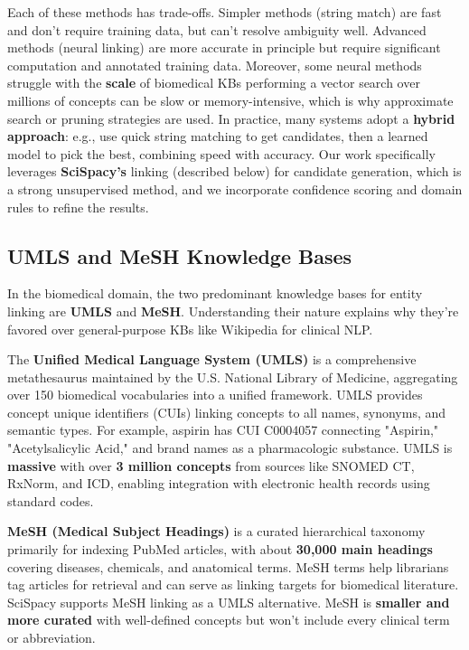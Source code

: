 Each of these methods has trade-offs. Simpler methods (string match) are fast and don't require training data, but can't resolve ambiguity well. Advanced methods (neural linking) are more accurate in principle but require significant computation and annotated training data. Moreover, some neural methods struggle with the \textbf{scale} of biomedical KBs performing a vector search over millions of concepts can be slow or memory-intensive, which is why approximate search or pruning strategies are used. In practice, many systems adopt a \textbf{hybrid approach}: e.g., use quick string matching to get candidates, then a learned model to pick the best, combining speed with accuracy. Our work specifically leverages \textbf{SciSpacy's} linking (described below) for candidate generation, which is a strong unsupervised method, and we incorporate confidence scoring and domain rules to refine the results.

\subsection{UMLS and MeSH Knowledge Bases}

In the biomedical domain, the two predominant knowledge bases for entity linking are \textbf{UMLS} and \textbf{MeSH}. Understanding their nature explains why they're favored over general-purpose KBs like Wikipedia for clinical NLP.

The \textbf{Unified Medical Language System (UMLS)} is a comprehensive metathesaurus maintained by the U.S. National Library of Medicine, aggregating over 150 biomedical vocabularies into a unified framework. UMLS provides concept unique identifiers (CUIs) linking concepts to all names, synonyms, and semantic types. For example, aspirin has CUI C0004057 connecting "Aspirin," "Acetylsalicylic Acid," and brand names as a pharmacologic substance. UMLS is \textbf{massive} with over \textbf{3 million concepts} from sources like SNOMED CT, RxNorm, and ICD, enabling integration with electronic health records using standard codes.

\textbf{MeSH (Medical Subject Headings)} is a curated hierarchical taxonomy primarily for indexing PubMed articles, with about \textbf{30,000 main headings} covering diseases, chemicals, and anatomical terms. MeSH terms help librarians tag articles for retrieval and can serve as linking targets for biomedical literature. SciSpacy supports MeSH linking as a UMLS alternative. MeSH is \textbf{smaller and more curated} with well-defined concepts but won't include every clinical term or abbreviation.

